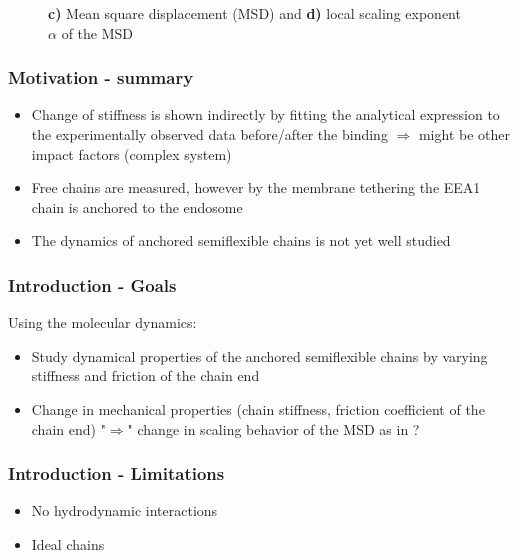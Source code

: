 \documentclass[handout]{beamer}
\begin{document}
\begin{frame}
\begin{figure}[h]
\begin{subfigure}[b]{0.49\textwidth}
        \end{subfigure}
        \caption{
            \textbf{c)} Mean square displacement (MSD) and \textbf{d)}
            local scaling exponent $\alpha$ of the MSD \cite{Singh:2022}
        }
    \end{figure}

\end{frame}


\begin{frame}
    \frametitle{Motivation - summary}
    \begin{itemize}
        \item Change of stiffness is shown indirectly by fitting the 
        analytical expression to the experimentally observed data before/after
        the binding $\Rightarrow$ might be other impact factors (complex system)
        \item Free chains are measured, however by the membrane tethering the EEA1 
        chain is anchored to the endosome
        \item The dynamics of anchored semiflexible chains is not yet well studied 
    \end{itemize} 
\end{frame}


\begin{frame}
    \frametitle{Introduction - Goals}

    Using the molecular dynamics:
    \vspace{0.5cm}
    \begin{itemize}
        \item Study dynamical properties of the anchored
        semiflexible chains by varying stiffness and friction of the chain end
        \item Change in mechanical properties (chain stiffness, friction coefficient of the chain end)
        "$\Rightarrow$" change in scaling behavior of the MSD as in \cite{Singh:2022}? 
    \end{itemize}

\end{frame}


\begin{frame}
    \frametitle{Introduction - Limitations}

    \begin{itemize}
        \item No hydrodynamic interactions
        \item Ideal chains
    \end{itemize}

\end{frame}
\end{document}
